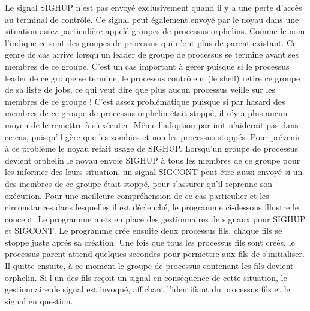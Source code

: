 Le signal SIGHUP n’est pas envoyé exclusivement quand il y a une perte d’accès au terminal de contrôle. Ce signal peut également envoyé par le noyau dans une situation assez particulière appelé groupes 
de processus orphelins. Comme le nom l’indique ce sont des groupes de processus qui n’ont plus de parent existant. Ce genre de cas arrive lorsqu’un leader de groupe de processus se termine avant ses membres de 
ce groupe. 
\newline
C’est un cas important à gérer puisque si le processus leader de ce groupe se termine, le processus contrôleur (le shell) retire ce groupe de sa liste de jobs, ce qui veut dire que plus aucun processus veille 
sur les membres de ce groupe ! C’est assez problématique puisque si par hasard des membres de ce groupe de processus orphelin était stoppé, il n’y a plus aucun moyen de le remettre à s’exécuter. Même l’adoption par 
init n’aiderait pas dans ce cas, puisqu’il gère que les zombies et non les processus stoppés.
\newline
Pour prévenir à ce problème le noyau refait usage de SIGHUP. Lorsqu’un groupe de processus devient orphelin le noyau envoie SIGHUP à tous les membres de ce groupe pour les informer des leurs situation, un signal 
SIGCONT peut être aussi envoyé si un des membres de ce groupe était stoppé, pour s’assurer qu’il reprenne son exécution. 
\newline
\newline
Pour une meilleure compréhension de ce cas particulier et les circonstances dans lesquelles il est déclenché, le programme ci-dessous illustre le concept.
Le programme mets en place des gestionnaires de signaux pour SIGHUP et SIGCONT. Le programme crée ensuite deux processus fils, chaque fils se stoppe juste aprés sa création.
\newline
Une fois que tous les processus fils sont créés, le processus parent attend quelques secondes pour permettre aux fils de s'initialiser. Il quitte ensuite, à ce moment le groupe de processus contenant les fils devient orphelin. 
Si l'un des fils reçoit un signal en conséquence de cette situation, le gestionnaire de signal est invoqué, affichant l'identifiant du processus fils et le signal en question.

